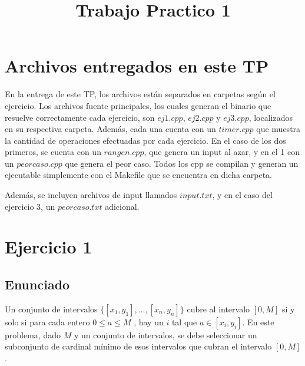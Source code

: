 \documentclass[a4paper, 10pt]{article}
\title{Trabajo Practico 1}
\begin{document}
\maketitle
\newpage

\tableofcontents
\newpage

\section{Archivos entregados en este TP}

En la entrega de este TP, los archivos están separados en carpetas según el ejercicio. Los archivos fuente principales, los cuales generan el binario que resuelve correctamente cada ejercicio, son $ej1.cpp$, $ej2.cpp$ y $ej3.cpp$, localizados en su respectiva carpeta. Además, cada una cuenta con un $timer.cpp$ que muestra la cantidad de operaciones efectuadas por cada ejercicio. En el caso de los dos primeros, se cuenta con un $rangen.cpp$, que genera un input al azar, y en el 1 con un $peorcaso.cpp$ que genera el peor caso. Todos los cpp se compilan y generan un ejecutable simplemente con el Makefile que se encuentra en dicha carpeta.

Además, se incluyen archivos de input llamados $input.txt$, y en el caso del ejercicio 3, un $peorcaso.txt$ adicional.

\section{Ejercicio 1}

\subsection{Enunciado}

Un conjunto de intervalos $\{[x_1 , y_1 ], ..., [x_n , y_n ]\}$ cubre al intervalo $[0, M ]$ si y solo si para cada entero
$0 \le a \le M$ , hay un $i$ tal que $a \in [x_i , y_i ]$. En este problema, dado $M$ y un conjunto de intervalos, se debe
seleccionar un subconjunto de cardinal mínimo de esos intervalos que cubran el intervalo $[0, M ]$.
\end{document}

